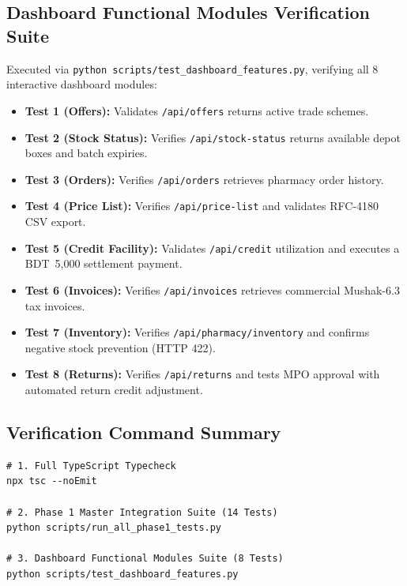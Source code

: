 \documentclass[10pt,a4paper]{article}
\begin{document}
\subsection{Dashboard Functional Modules Verification Suite}
Executed via \texttt{python scripts/test\_dashboard\_features.py}, verifying all 8 interactive dashboard modules:
\begin{itemize}[leftmargin=*]
    \item \textbf{Test 1 (Offers):} Validates \texttt{/api/offers} returns active trade schemes.
    \item \textbf{Test 2 (Stock Status):} Verifies \texttt{/api/stock-status} returns available depot boxes and batch expiries.
    \item \textbf{Test 3 (Orders):} Verifies \texttt{/api/orders} retrieves pharmacy order history.
    \item \textbf{Test 4 (Price List):} Verifies \texttt{/api/price-list} and validates RFC-4180 CSV export.
    \item \textbf{Test 5 (Credit Facility):} Validates \texttt{/api/credit} utilization and executes a BDT~5,000 settlement payment.
    \item \textbf{Test 6 (Invoices):} Verifies \texttt{/api/invoices} retrieves commercial Mushak-6.3 tax invoices.
    \item \textbf{Test 7 (Inventory):} Verifies \texttt{/api/pharmacy/inventory} and confirms negative stock prevention (HTTP 422).
    \item \textbf{Test 8 (Returns):} Verifies \texttt{/api/returns} and tests MPO approval with automated return credit adjustment.
\end{itemize}

\subsection{Verification Command Summary}
\begin{verbatim}
# 1. Full TypeScript Typecheck
npx tsc --noEmit

# 2. Phase 1 Master Integration Suite (14 Tests)
python scripts/run_all_phase1_tests.py

# 3. Dashboard Functional Modules Suite (8 Tests)
python scripts/test_dashboard_features.py
\end{verbatim}

\end{document}
